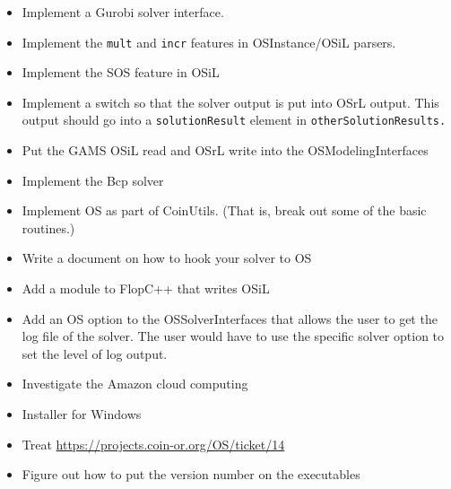 %
%

\begin{itemize}
\item Implement a Gurobi solver interface.

\item Implement the {\tt mult} and {\tt incr} features in OSInstance/OSiL parsers.

\item Implement the SOS feature in OSiL

\item Implement a switch so that the solver output is put into OSrL output. This output should go into a {\tt solutionResult} element in {\tt otherSolutionResults.}

\item Put the GAMS OSiL read and OSrL write into the OSModelingInterfaces

\item Implement the Bcp solver

\item Implement OS as part of CoinUtils. (That is, break out some of the basic routines.)

\item Write a document on how to hook your solver to OS

\item Add a module to FlopC++ that writes OSiL

\item Add an OS option to the OSSolverInterfaces that allows the user to get the log file of the solver. The user would have to use the specific solver option to set the level of log output.

\item Investigate the Amazon cloud computing

\item Installer for Windows

\item Treat \url{https://projects.coin-or.org/OS/ticket/14} 

\item Figure out how to put the version number on the executables


\end{itemize}
